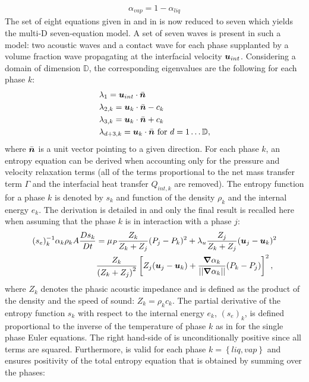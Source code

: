 %
\begin{align}
 \alpha_{vap}= 1 - \alpha_{liq}
\end{align}
%
The set of eight equations given in  and in  is now reduced to seven which yields the multi-D seven-equation model. A set of seven waves is present in such a model: two acoustic waves and a contact wave for each phase supplanted by a volume fraction wave propagating at the interfacial velocity $\boldsymbol u_{int}$. Considering a domain of dimension $\mathbb{D}$, the corresponding eigenvalues are the following for each phase $k$:
% 
\begin{align}
&\lambda_1 = \boldsymbol u_{int} \cdot \bar{\boldsymbol n} \nonumber\\
&\lambda_{2,k} = \boldsymbol u_k \cdot \bar{\boldsymbol n} - c_k \nonumber\\
&\lambda_{3,k} = \boldsymbol u_k \cdot \bar{\boldsymbol n} + c_k \nonumber\\
&\lambda_{d+3,k} = \boldsymbol u_k \cdot \bar{\boldsymbol n} \text{ for } d = 1 \dots \mathbb{D},\nonumber
\end{align}
%
where $\bar{\boldsymbol n}$ is a unit vector pointing to a given direction.
For each phase $k$, an entropy equation can be derived when accounting only for the pressure and velocity relaxation terms (all of the terms proportional to the net mass transfer term $\Gamma$ and the interfacial heat transfer $Q_{int,k}$ are removed). The entropy function for a phase $k$ is denoted by $s_k$ and function of the density $\rho_k$ and the internal energy $e_k$. The derivation is detailed in  and only the final result is recalled here when assuming that the phase $k$ is in interaction with a phase $j$:
%
\begin{align}\label{eq:ent-eqn-7-eqn-model}
(s_{e})_k^{-1} \alpha_k \rho_k A \frac{Ds_k}{Dt} &= \mu_P \frac{Z_k}{Z_k+Z_j} (P_j - P_k)^2 + \lambda_u \frac{Z_j}{Z_k+Z_j} (\boldsymbol u_j -\boldsymbol u_k)^2 \nonumber
\\
& \frac{Z_k}{\left( Z_k+Z_j \right)^2} \left[ Z_j (\boldsymbol u_j-\boldsymbol u_k)+\frac{\boldsymbol{\nabla} \alpha_k}{|| \boldsymbol{\nabla} \alpha_k ||}(P_k-P_j)\right]^2,
\end{align}
where $Z_{k}$ denotes the phasic acoustic impedance and is defined as the product of the density and the speed of sound: $Z_k = \rho_k c_k$. The partial derivative of the entropy function $s_k$ with respect to the internal energy $e_k$, $(s_e)_k$, is defined proportional to the inverse of the temperature of phase $k$ as in  for the single phase Euler equations. The right hand-side of  is unconditionally positive since all terms are squared. Furthermore,  is valid for each phase $k=\left\{liq, vap \right\}$ and ensures positivity of the total entropy equation that is obtained by summing over the phases:
